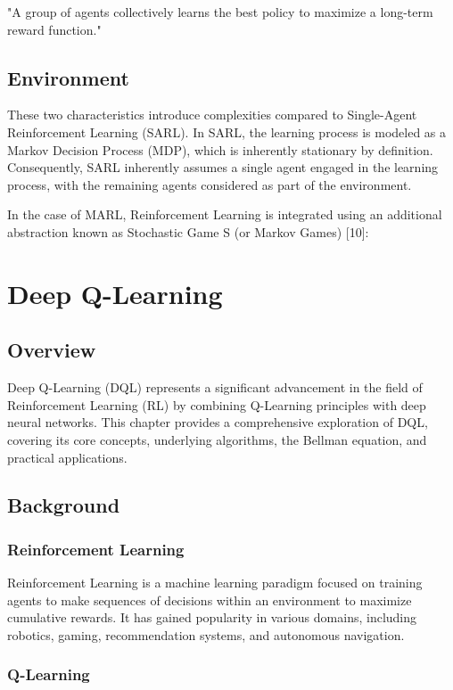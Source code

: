 \documentclass{scrartcl}
\begin{document}
"A group of agents collectively learns the best policy to maximize a long-term reward function."

\subsection{Environment}
These two characteristics introduce complexities compared to Single-Agent Reinforcement 
Learning (SARL). In SARL, the learning process is modeled as a Markov Decision Process (MDP),
 which is inherently stationary by definition. Consequently, SARL inherently assumes a single
  agent engaged in the learning process, with the remaining agents considered as part of the 
  environment.

In the case of MARL, Reinforcement Learning is integrated using an additional abstraction 
known as Stochastic Game S (or Markov Games) [10]:

\newpage

\section{Deep Q-Learning}

\subsection{Overview}

Deep Q-Learning (DQL) represents a significant advancement in the field of Reinforcement Learning (RL) by combining Q-Learning principles with deep neural networks. This chapter provides a comprehensive exploration of DQL, covering its core concepts, underlying algorithms, the Bellman equation, and practical applications.

\subsection{Background}

\subsubsection{Reinforcement Learning}

Reinforcement Learning is a machine learning paradigm focused on training agents to make sequences of decisions within an environment to maximize cumulative rewards. It has gained popularity in various domains, including robotics, gaming, recommendation systems, and autonomous navigation.

\subsubsection{Q-Learning}
\end{document}
